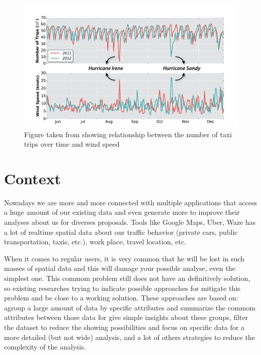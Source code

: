 \begin{figure}[t]
	\centering
	\includegraphics[width=\textwidth]{images/outlier-freire-figure-1}
	\caption{Figure taken from \cite{DBLP:journals/debu/FreireCVZ16} showing  relationship between the number of taxi trips over time and wind speed}
	\label{fig:freire-paper-taxy-wind}
	\vspace{-10pt}
\end{figure}

\section{Context}

Nowadays we are more and more connected with multiple applications that access a huge
amount of our existing data and even generate more to improve their analyses about
us for diverses proposals. Tools like Google Maps, Uber, Waze has a lot of realtime
spatial data about our traffic behavior (private cars, public transportation, taxis,
etc.), work place, travel location, etc.

When it comes to regular users, it is very common that he will be lost in such masses
of spatial data and this will damage your possible analyse, even the simplest one.
This commom problem still does not have an definitively solution, so existing researches
trying to indicate possible approaches for mitigate this problem and be close to a
working solution. These approaches are based on: agroup a large amount of data by specific
attributes and summarize the commom attributes between those data for give simple
insights about these groups, filter the dataset to reduce the showing possibilities and
focus on specific data for a more detailed (but not wide) analysis, and a lot of others
strategies to reduce the complexity of the analysis.

